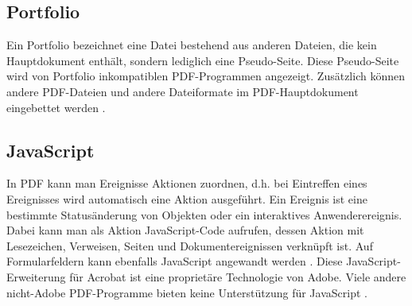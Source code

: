 \subsection{Portfolio}
Ein Portfolio bezeichnet eine Datei bestehend aus anderen Dateien, die kein Hauptdokument enthält, sondern lediglich eine Pseudo-Seite. Diese Pseudo-Seite wird von Portfolio inkompatiblen PDF-Programmen angezeigt. Zusätzlich können andere PDF-Dateien und andere Dateiformate im PDF-Hauptdokument eingebettet werden \cite{softx}. 

\subsection{JavaScript}
In PDF kann man Ereignisse Aktionen zuordnen, d.h. bei Eintreffen eines Ereignisses wird automatisch eine Aktion ausgeführt. Ein Ereignis ist eine bestimmte Statusänderung von Objekten oder ein interaktives Anwenderereignis. Dabei kann man als Aktion JavaScript-Code aufrufen, dessen Aktion mit Lesezeichen, Verweisen, Seiten und Dokumentereignissen verknüpft ist. Auf Formularfeldern kann ebenfalls JavaScript angewandt werden \cite{softx}.  Diese JavaScript-Erweiterung für Acrobat ist eine proprietäre Technologie von Adobe. Viele andere nicht-Adobe PDF-Programme bieten keine Unterstützung für JavaScript \cite{wiki-pdf-engl}. 